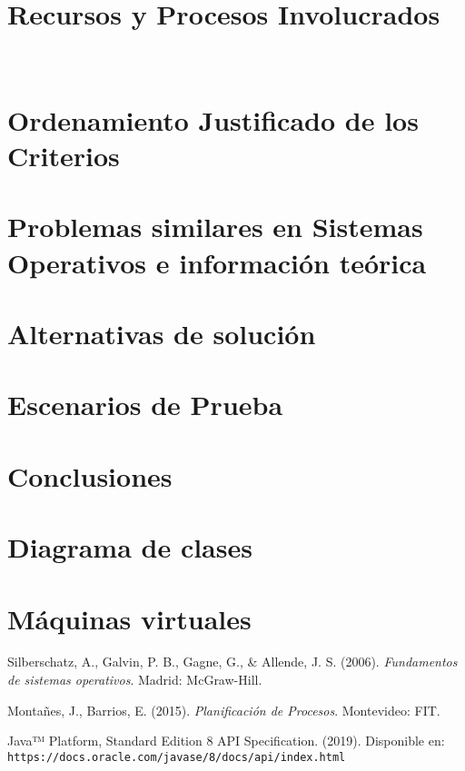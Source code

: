 \documentclass[11pt]{report}
\begin{document}


\tableofcontents

\chapter{Recursos y Procesos Involucrados}

\
\chapter{Ordenamiento Justificado de los Criterios}\label{cap:criterios}


\chapter{Problemas similares en Sistemas Operativos e información teórica}


\chapter{Alternativas de solución}


\chapter{Escenarios de Prueba}


\chapter{Conclusiones}


\appendix

\chapter{Diagrama de clases}


\chapter{Máquinas virtuales}


\begin{thebibliography}{1}
\raggedright
{}
Silberschatz, A., Galvin, P. B., Gagne, G., \& Allende, J. S.
(2006).
\textit{Fundamentos de sistemas operativos}.
Madrid: McGraw-Hill.

Montañes, J., Barrios, E.
(2015).
\textit{Planificación de Procesos}.
Montevideo: FIT.

Java™ Platform, Standard Edition 8 API Specification.
(2019).
Disponible en: \texttt{https://docs.oracle.com/javase/8/docs/api/index.html}
\end{thebibliography}
\end{document}
